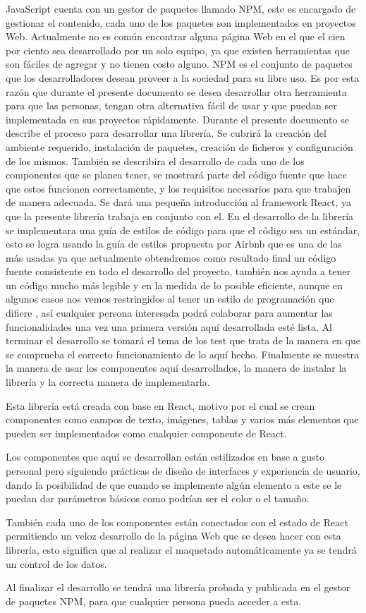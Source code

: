 JavaScript cuenta con un gestor de paquetes llamado NPM, este es encargado de gestionar el contenido, cada uno de los paquetes son  implementados en proyectos Web.
Actualmente no es común encontrar alguna página Web en el que el cien por ciento sea desarrollado por un solo equipo, ya que existen herramientas que son fáciles de agregar y no tienen costo alguno.
NPM es el conjunto de paquetes que los desarrolladores desean proveer a la sociedad para su libre uso.
Es por esta razón que durante el presente documento se desea desarrollar otra herramienta para que las personas, tengan otra alternativa fácil de usar y que puedan ser implementada en sus proyectos rápidamente.
Durante el presente documento se describe el proceso para desarrollar una librería. 
Se cubrirá la creación del ambiente requerido, instalación de paquetes, creación de ficheros y configuración de los mismos. 
También se describira el desarrollo de cada uno de los componentes que se planea tener, se mostrará parte del código fuente que hace que estos funcionen correctamente, y los requisitos necesarios para que trabajen de manera adecuada. 
Se dará una pequeña introducción al framework React, ya que la presente librería trabaja en conjunto con el.
En el desarrollo de la librería se implementara una guía de estilos de código para que el código sea un estándar, esto se logra usando la guía de estilos propuesta por Airbnb \cite{airbnb}que es una de las más usadas ya que actualmente obtendremos como resultado final un código fuente consistente en todo el desarrollo del proyecto, también nos ayuda a tener un código mucho más legible y en la medida de lo posible eficiente, aunque en algunos casos nos vemos restringidos al tener un estilo de programación que difiere , así cualquier persona interesada podrá colaborar para aumentar las funcionalidades una vez una primera versión aquí desarrollada esté lista.
Al terminar el desarrollo se tomará el tema de los test que trata de la manera en que se comprueba el correcto funcionamiento de lo aquí hecho.
Finalmente se muestra la manera de usar los componentes aquí desarrollados, la manera de instalar la librería y la correcta manera de implementarla.

Esta librería está creada con base en React, motivo por el cual se crean componentes como campos de texto, imágenes, tablas y varios más elementos que pueden ser implementados como cualquier componente de React. 

Los componentes que aquí se desarrollan están estilizados en base a gusto personal pero siguiendo prácticas de diseño de interfaces y experiencia de usuario, dando la posibilidad de que cuando se implemente algún elemento a este se le puedan dar parámetros básicos como podrían ser el color o el tamaño.

También cada uno de los componentes están conectados con el estado de React permitiendo un veloz desarrollo de la página Web que se desea hacer con esta librería, esto significa que al realizar el maquetado automáticamente ya se tendrá un control de los datos.

Al finalizar el desarrollo se tendrá una librería probada y publicada en el gestor de paquetes NPM, para que cualquier persona pueda acceder a esta.